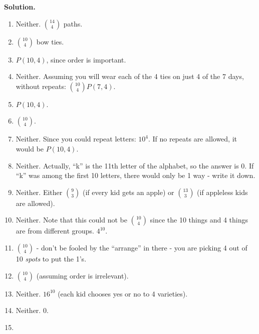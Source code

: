 \documentclass[10pt,]{book}
\theoremstyle{plain}
\theoremstyle{definition}
\theoremstyle{definition}
\theoremstyle{definition}
\numberwithin{equation}{section}
\begin{document}
\begin{exerciselist}
\par\smallskip
\par\smallskip
\noindent\textbf{Solution.}\hypertarget{solution-154}{}\quad

            \leavevmode%
\begin{enumerate}[label=(\alph*)]
\item\hypertarget{li-693}{}
                  Neither. \({14 \choose 4}\) paths.
\item\hypertarget{li-694}{}\({10\choose 4}\) bow ties.%
\item\hypertarget{li-695}{}\(P(10,4)\), since order is important.%
\item\hypertarget{li-696}{}
                  Neither. Assuming you will wear each of the 4 ties on just 4 of the 7 days, without repeats: \({10\choose 4}P(7,4)\).
\item\hypertarget{li-697}{}\(P(10,4)\).%
\item\hypertarget{li-698}{}\({10\choose 4}\).%
\item\hypertarget{li-699}{}
                  Neither. Since you could repeat letters: \(10^4\). If no repeats are allowed, it would be \(P(10,4)\).
\item\hypertarget{li-700}{}
                  Neither. Actually, ``k'' is the 11th letter of the alphabet, so the answer is 0. If ``k'' was among the first 10 letters, there would only be 1 way - write it down.
\item\hypertarget{li-701}{}
                  Neither. Either \({9\choose 3}\) (if every kid gets an apple) or \({13 \choose 3}\) (if appleless kids are allowed).
\item\hypertarget{li-702}{}
                  Neither. Note that this could not be \({10 \choose 4}\) since the 10 things and 4 things are from different groups. \(4^{10}\).
\item\hypertarget{li-703}{}\({10 \choose 4}\) - don't be fooled by the ``arrange'' in there - you are picking 4 out of 10 \emph{spots} to put the 1's.%
\item\hypertarget{li-704}{}\({10 \choose 4}\) (assuming order is irrelevant).%
\item\hypertarget{li-705}{}
                  Neither. \(16^{10}\) (each kid chooses yes or no to 4 varieties).
\item\hypertarget{li-706}{}
                  Neither. 0.
\item\hypertarget{li-707}{}

\end{enumerate}
\end{exerciselist}
\end{document}
